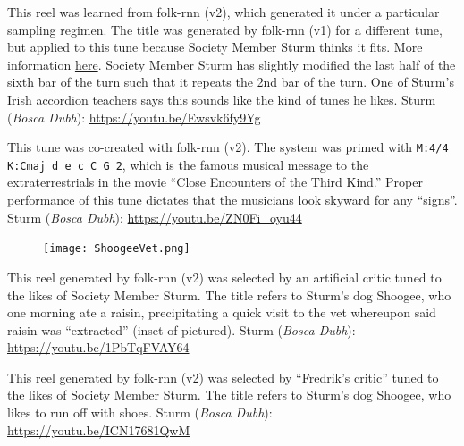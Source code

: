 \documentclass[a4paper,notitlepage,twoside]{book}
\begin{document}
{}  
\hypertarget{reel:MickeyFitternalys}{}
This reel was learned from folk-rnn (v2),
which generated it under a particular sampling regimen.
The title was generated by folk-rnn (v1) for a different tune, 
but applied to this tune because Society Member Sturm thinks it fits.
More information \href{https://highnoongmt.wordpress.com/2019/08/19/making-sense-of-the-folk-rnn-v2-model-part-11/}{here}.
Society Member Sturm has slightly modified the last half of the sixth bar of the turn 
such that it repeats the 2nd bar of the turn. 
One of Sturm's Irish accordion teachers says this sounds like the kind of tunes he likes.
Sturm ({\em Bosca Dubh}): \url{https://youtu.be/Ewsvk6fy9Yg}

{}  
\hypertarget{reel:CloseEncountersReel}{}
This tune was co-created with folk-rnn (v2).
The system was primed with {\tt M:4/4 K:Cmaj d e c C G 2},
which is the famous musical message to the extraterrestrials in 
the movie ``Close Encounters of the Third Kind.''
Proper performance of this tune dictates that the musicians look skyward for any ``signs''.
Sturm ({\em Bosca Dubh}): \url{https://youtu.be/ZN0Fi_oyu44}
  
{}  
  
\hypertarget{reel:DogRaisin}{}
\begin{figure}
\vspace{-0.3in}
\texttt{[image: ShoogeeVet.png]}
\end{figure}
This reel generated by folk-rnn (v2) was selected by an artificial critic 
tuned to the likes of Society Member Sturm.
The title refers to Sturm's dog Shoogee,
who one morning ate a raisin, 
precipitating a quick visit to the vet
whereupon said raisin was ``extracted'' (inset of pictured).
Sturm ({\em Bosca Dubh}): \url{https://youtu.be/1PbTqFVAY64}

\clearpage
{}
{}  
  
\hypertarget{reel:ShoogeeTakeAnotherShoe}{}
This reel generated by folk-rnn (v2) was selected by ``Fredrik's critic'' 
tuned to the likes of Society Member Sturm.
The title refers to Sturm's dog Shoogee,
who likes to run off with shoes. 
Sturm ({\em Bosca Dubh}): \url{https://youtu.be/ICN17681QwM}
\end{document}
